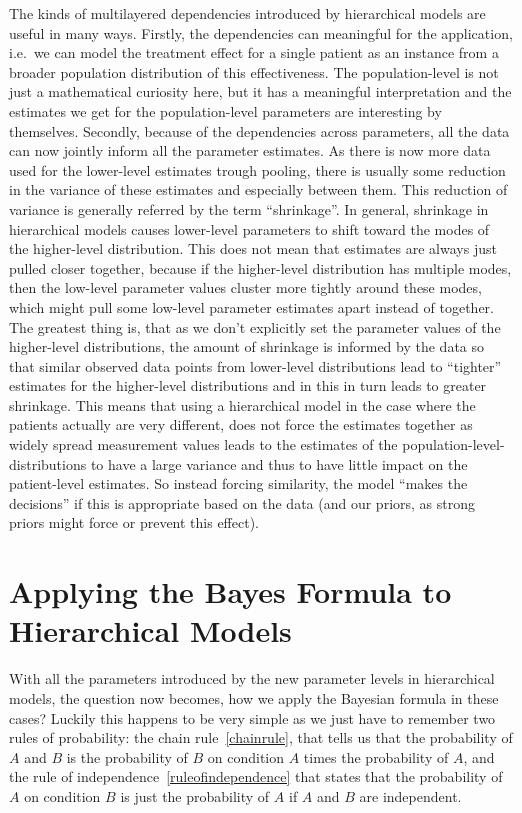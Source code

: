 \documentclass[12pt,a4paper,leqno]{report}
\theoremstyle{plain}
\theoremstyle{definition}
\theoremstyle{remark}
\begin{document}
The kinds of multilayered dependencies introduced by hierarchical models are useful in many ways.
Firstly, the dependencies can meaningful for the application, i.e.\ we can
model the treatment effect for a single patient as an instance from a
broader population distribution of this effectiveness. The population-level is not just
a mathematical curiosity here, but it has a meaningful interpretation and the estimates we
get for the population-level parameters are interesting by themselves. Secondly, because
of the dependencies across parameters, all the data can now jointly inform all the
parameter estimates. As there is now more data used for the lower-level estimates trough
pooling, there is usually some reduction in the variance of these estimates
and especially between them. This reduction of variance is
generally referred by the term ``shrinkage''. In general,
shrinkage in hierarchical models causes lower-level parameters to shift toward the modes
of the higher-level distribution. This does not mean that
estimates are always just pulled closer together, because if the higher-level
distribution has multiple modes, then the low-level parameter values cluster
more tightly around these modes, which might pull some
low-level parameter estimates apart instead of together. The greatest thing
is, that as we don't explicitly set the parameter values of the higher-level
distributions, the amount of shrinkage is informed by the data so that
similar observed data points from lower-level distributions lead to ``tighter''
estimates for the higher-level distributions and in this in turn leads to
greater shrinkage. This means that using a hierarchical model in the case where the
patients actually are very different, does not force the estimates together as
widely spread measurement values leads to the estimates of the population-level-distributions to
have a large variance and thus to have little impact on the patient-level estimates. So
instead forcing similarity, the model ``makes the decisions'' if this is appropriate
based on the data (and our priors, as strong priors might force or prevent this effect).

\section{Applying the Bayes Formula to Hierarchical Models}

With all the parameters introduced by the new parameter levels in hierarchical models,
the question now becomes, how we apply
the Bayesian formula in these cases? Luckily this happens to be very simple as we just
have to remember two rules of probability: the chain rule\ \ref{chainrule}, that
tells us that the probability of \(A\) and \(B\) is the probability of \(B\) on condition \(A\)
times the probability of \(A\), and the rule of independence\ \ref{ruleofindependence}
that states that the
probability of \(A\) on condition \(B\) is just the probability of \(A\) if \(A\) and
\(B\) are independent.
\end{document}
